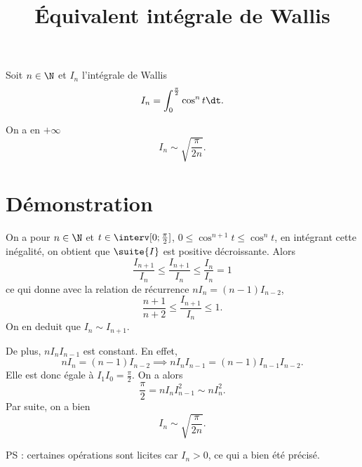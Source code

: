 \documentclass[fontsize=12pt,twoside=false,parskip=half]{scrartcl}
\title{Équivalent intégrale de Wallis}
\date{}
\author{}
\begin{document}
\maketitle
   Soit $n \in \N$ et $I_n$ l’intégrale de Wallis
   \[
      I_n = \int_0^{\frac{\pi}{2}} \cos^n t \dt.
   \]
   \begin{Theoreme}
      On a en $+\infty$
      \[
         I_n \sim \sqrt{\frac{\pi}{2n}}.
      \]
   \end{Theoreme}
   \section{Démonstration}
      On a pour $n \in \N$ et $t \in \interv[0; \frac{\pi}{2}]$, 
      $0 \leq \cos^{n + 1} t \leq \cos^{n} t$, en intégrant cette inégalité, 
      on obtient que $\suite{I}$ est positive décroissante. Alors
      \[
         \frac{I_{n + 1}}{I_n} \leq \frac{I_{n + 1}}{I_n} \leq \frac{I_n}{I_n} = 1
      \]
      ce qui donne avec la relation de récurrence $nI_n = (n - 1)I_{n - 2}$,
      \[
         \frac{n + 1}{n + 2} \leq \frac{I_{n + 1}}{I_n} \leq 1.
      \]
      On en deduit que $I_n \sim I_{n + 1}$.
      
      De plus, $nI_nI_{n - 1}$ est constant. En effet, 
      \[
         nI_n = (n - 1)I_{n - 2} \implies nI_nI_{n - 1} = (n - 1)I_{n - 1}I_{n - 2}. 
      \]
      Elle est donc égale à $I_1I_0 = \frac{\pi}{2}$. On a alors
      \[
         \frac{\pi}{2} = nI_nI_{n - 1}^2 \sim nI_n^2. 
      \]
      Par suite, on a bien 
      \[
         I_n \sim \sqrt{\frac{\pi}{2n}}.
      \]
      
      PS : certaines opérations sont licites car $I_n > 0$, ce qui a bien été précisé.
\end{document}
